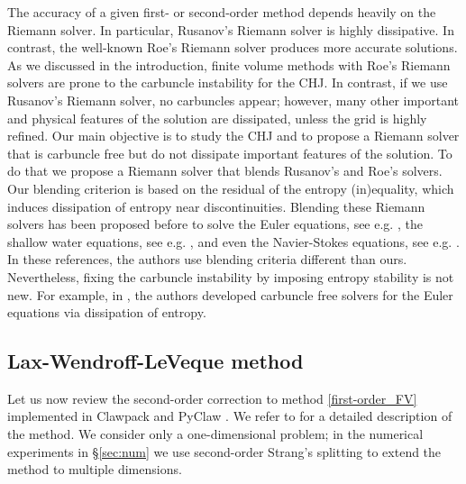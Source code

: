 \documentclass[preprint, 11pt]{article}
\begin{document}
The accuracy of a given first- or second-order method depends heavily on the Riemann solver.
In particular, Rusanov's Riemann solver is highly dissipative. In contrast, the well-known
Roe's Riemann solver produces more accurate solutions.
%
As we discussed in the introduction, finite volume methods with
Roe's Riemann solvers are prone to the carbuncle instability for the CHJ.
In contrast, if we use Rusanov's
Riemann solver, no carbuncles appear; however, many other important and physical features of
the solution are dissipated, unless the grid is highly refined.
Our main objective is to study the CHJ and to propose a Riemann solver
that is carbuncle free but do not dissipate important features of the solution.
To do that we propose a Riemann solver that blends Rusanov's and Roe's solvers.
Our blending criterion is based on the residual of the entropy (in)equality,
which induces dissipation of entropy near discontinuities.
Blending these Riemann solvers has been proposed before
to solve the Euler equations, see e.g.
\cite{nishikawa2008very,wang2016developing,jaisankar2007diffusion,ohwada2018simple,deng2019new,ray2013entropy},
the shallow water equations, see e.g. \cite{bader2014carbuncle,kemm2014note},
and even the Navier-Stokes equations, see e.g. \cite{nishikawa2008very,ohwada2018simple}.
In these references, the authors use blending criteria different than ours.
Nevertheless, fixing the carbuncle instability by imposing entropy stability is not new.
For example, in \cite{ismail2009affordable,ismail2009proposed},
the authors developed carbuncle free solvers for the Euler equations
via dissipation of entropy.

\subsection{Lax-Wendroff-LeVeque method}\label{sec:lax-wendroff-leveque}
Let us now review the second-order correction to method \eqref{first-order_FV} implemented in
Clawpack \cite{clawpack} and PyClaw \cite{pyclaw-sisc}.
We refer to \cite{leveque1997wave, leveque2002finite} for a detailed description of the method.
We consider only a one-dimensional problem; in the
numerical experiments in \S\ref{sec:num} we use second-order Strang's splitting \cite{strang1968construction}
to extend the method to multiple dimensions.
\end{document}
